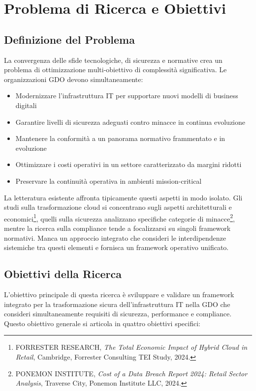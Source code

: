 \section{Problema di Ricerca e Obiettivi}

\subsection{Definizione del Problema}

La convergenza delle sfide tecnologiche, di sicurezza e normative crea un problema di ottimizzazione multi-obiettivo di complessità significativa. Le organizzazioni GDO devono simultaneamente:

\begin{itemize}
\item Modernizzare l'infrastruttura IT per supportare nuovi modelli di business digitali
\item Garantire livelli di sicurezza adeguati contro minacce in continua evoluzione
\item Mantenere la conformità a un panorama normativo frammentato e in evoluzione
\item Ottimizzare i costi operativi in un settore caratterizzato da margini ridotti
\item Preservare la continuità operativa in ambienti mission-critical
\end{itemize}

La letteratura esistente affronta tipicamente questi aspetti in modo isolato. Gli studi sulla trasformazione cloud si concentrano sugli aspetti architetturali e economici\footnote{FORRESTER RESEARCH, \textit{The Total Economic Impact of Hybrid Cloud in Retail}, Cambridge, Forrester Consulting TEI Study, 2024.}, quelli sulla sicurezza analizzano specifiche categorie di minacce\footnote{PONEMON INSTITUTE, \textit{Cost of a Data Breach Report 2024: Retail Sector Analysis}, Traverse City, Ponemon Institute LLC, 2024.}, mentre la ricerca sulla compliance tende a focalizzarsi su singoli framework normativi. Manca un approccio integrato che consideri le interdipendenze sistemiche tra questi elementi e fornisca un framework operativo unificato.

\subsection{Obiettivi della Ricerca}

L'obiettivo principale di questa ricerca è sviluppare e validare un framework integrato per la trasformazione sicura dell'infrastruttura IT nella GDO che consideri simultaneamente requisiti di sicurezza, performance e compliance. Questo obiettivo generale si articola in quattro obiettivi specifici:

